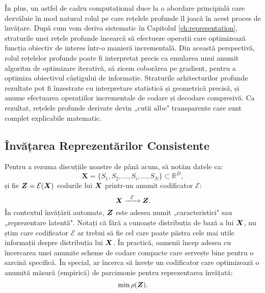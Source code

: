 \documentclass[../../book-main_ro.tex]{subfiles}
\begin{document}
În plus, un astfel de cadru computațional duce la o abordare principială care dezvăluie în mod natural rolul pe care rețelele profunde îl joacă în acest proces de învățare. După cum vom deriva sistematic în Capitolul \ref{ch:representation}, straturile unei rețele profunde încearcă să efectueze operații care optimizează funcția obiectiv de interes într-o manieră incrementală. Din această perspectivă, rolul rețelelor profunde poate fi interpretat precis ca emularea unui anumit algoritm de optimizare iterativă, să zicem coborârea pe gradient, pentru a optimiza obiectivul câștigului de informație. Straturile arhitecturilor profunde rezultate pot fi înzestrate cu interpretare statistică și geometrică precisă, și anume efectuarea operațiilor incrementale de codare și decodare compresivă. Ca rezultat, rețelele profunde derivate devin „cutii albe" transparente care sunt complet explicabile matematic.










\subsection{Învățarea Reprezentărilor Consistente}

\label{sec:consistency}
Pentru a rezuma discuțiile noastre de până acum, să notăm datele ca:
\begin{equation}
    \boldsymbol{X} = \{S_1, S_2, \ldots, S_i, \ldots, S_N\} \subset \mathbb{R}^D,
\end{equation}
și fie $\boldsymbol{Z} = \mathcal{E}(\bm{X})$ codurile lui $\bm{X}$ printr-un anumit codificator $\mathcal{E}$:
\begin{equation}
    \bm{X}  \xrightarrow{\hspace{2mm} \mathcal{E}\hspace{2mm}} \bm{Z}.
    \label{eqn:open-loop}
\end{equation}
În contextul învățării automate, $\bm{Z}$ este adesea numit „caracteristici" sau „reprezentare latentă". Notați că fără a cunoaște distribuția de bază a lui $\bm{X}$, nu știm care codificator $\mathcal{E}$ ar trebui să fie cel care poate păstra cele mai utile informații despre distribuția lui $\bm{X}$. În practică, oamenii încep adesea cu încercarea unei anumite scheme de codare compacte care servește bine pentru o sarcină specifică. În special, ar încerca să învețe un codificator care optimizează o anumită măsură (empirică) de parcimonie pentru reprezentarea învățată:
\begin{equation}
    \min \rho(\bm{Z}).
\end{equation}
\end{document}
